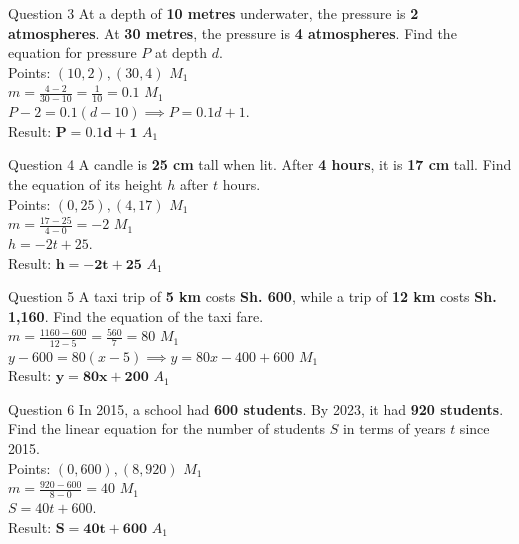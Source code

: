 \documentclass[12pt, a4paper, oneside]{article}
\begin{document}
\begin{solvingbox}{Question 3}
At a depth of \textbf{10 metres} underwater, the pressure is \textbf{2 atmospheres}. At \textbf{30 metres}, the pressure is \textbf{4 atmospheres}. Find the equation for pressure $P$ at depth $d$. \\
Points: $(10, 2), (30, 4)$ \hfill $M_1$ \\
$m = \frac{4 - 2}{30 - 10} = \frac{1}{10} = 0.1$ \hfill $M_1$ \\
$P - 2 = 0.1(d - 10) \implies P = 0.1d + 1$. \\
Result: $\mathbf{P = 0.1d + 1}$ \hfill $A_1$
\end{solvingbox}

\begin{solvingbox}{Question 4}
A candle is \textbf{25 cm} tall when lit. After \textbf{4 hours}, it is \textbf{17 cm} tall. Find the equation of its height $h$ after $t$ hours. \\
Points: $(0, 25), (4, 17)$ \hfill $M_1$ \\
$m = \frac{17 - 25}{4 - 0} = -2$ \hfill $M_1$ \\
$h = -2t + 25$. \\
Result: $\mathbf{h = -2t + 25}$ \hfill $A_1$
\end{solvingbox}

\begin{solvingbox}{Question 5}
A taxi trip of \textbf{5 km} costs \textbf{Sh. 600}, while a trip of \textbf{12 km} costs \textbf{Sh. 1,160}. Find the equation of the taxi fare. \\
$m = \frac{1160 - 600}{12 - 5} = \frac{560}{7} = 80$ \hfill $M_1$ \\
$y - 600 = 80(x - 5) \implies y = 80x - 400 + 600$ \hfill $M_1$ \\
Result: $\mathbf{y = 80x + 200}$ \hfill $A_1$
\end{solvingbox}

\begin{solvingbox}{Question 6}
In 2015, a school had \textbf{600 students}. By 2023, it had \textbf{920 students}. Find the linear equation for the number of students $S$ in terms of years $t$ since 2015. \\
Points: $(0, 600), (8, 920)$ \hfill $M_1$ \\
$m = \frac{920 - 600}{8 - 0} = 40$ \hfill $M_1$ \\
$S = 40t + 600$. \\
Result: $\mathbf{S = 40t + 600}$ \hfill $A_1$
\end{solvingbox}
\end{document}
